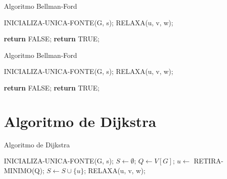 \documentclass[aspectratio=169]{beamer}
\begin{document}
	
	\begin{frame}{Algoritmo Bellman-Ford}
		\begin{algorithm}[H]
			\caption{Bellman-Ford}\label{alg:d}
			\begin{algorithmic}[1]
				\State INICIALIZA-UNICA-FONTE(G, s);
				   
				   
				\State RELAXA(u, v, w);   
				\EndFor
				\EndFor
				
				 
				\State \textbf{return} FALSE;
				\EndIf
				\EndFor
				\State \textbf{return} TRUE;
				\EndProcedure
			\end{algorithmic}
		\end{algorithm}
	\end{frame}
	
	\begin{frame}{Algoritmo Bellman-Ford}
		\begin{algorithm}[H]
			\caption{Bellman-Ford}\label{alg:d}
			\begin{algorithmic}[1]
				\State INICIALIZA-UNICA-FONTE(G, s);
				   
				   
				\State RELAXA(u, v, w);   
				\EndFor
				\EndFor
				
				 
				   
				\State \textbf{return} FALSE;
				\EndIf
				\EndFor
				\State \textbf{return} TRUE;
				\EndProcedure
			\end{algorithmic}
		\end{algorithm}
	\end{frame}
	
\section{Algoritmo de Dijkstra}
	\begin{frame}{Algoritmo de Dijkstra}
		\begin{algorithm}[H]
			\caption{Dijkstra}\label{alg:d}
			\begin{algorithmic}[1]
				\State INICIALIZA-UNICA-FONTE(G, s);
				\State $S\gets \emptyset$;
				\State $Q\gets V[G]$;
				\State $u\gets$ RETIRA-MINIMO(Q);
				\State $S\gets S \cup \{u\}$;
				\State RELAXA(u, v, w);
				\EndFor
				\EndWhile\label{euclidendwhile}
				\EndProcedure
			\end{algorithmic}
		\end{algorithm}
	\end{frame}
	
\end{document}

